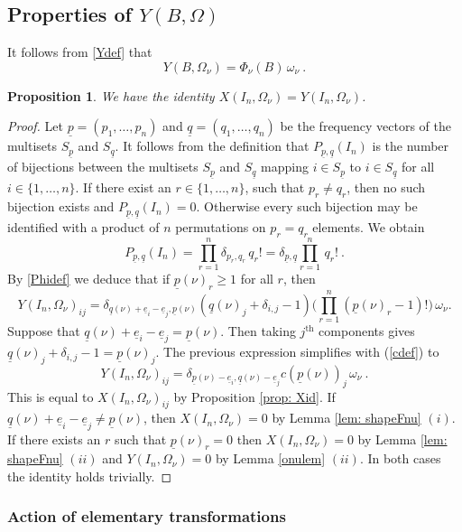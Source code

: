 \documentclass[10pt]{amsart}
\newcommand{\pp}{{\underline{p}}}
\newcommand{\qq}{{\underline{q}}}
\newcommand{\eee}{{\underline{e}}}
\theoremstyle{plain}
\newtheorem{prop}[thm]{Proposition}
\newcommand{\0}{\color{blue}{\mathsf{0}}}
\begin{document}
\subsection{Properties of \texorpdfstring{$Y(B, \Omega)$}{Y} } It follows from   \eqref{Ydef} that
\begin{equation} \label{Ynu}
Y(B,\Omega_{\nu})=\Phi_{\nu}(B)\,\omega_\nu \ . 
\end{equation}

\begin{prop} \label{prop: XYid} We have the identity $X(I_n, \Omega_{\nu}) = Y(I_n,\Omega_{\nu})$. 
\end{prop}
\begin{proof}
Let $\pp=(p_1,\ldots, p_n)$ and $\qq=(q_1,\ldots, q_n)$ be the
frequency vectors of the multisets $S_\pp$ and $S_\qq$. It follows from the definition that $P_{\pp,\qq}(I_n)$
is the number of bijections between the multisets $S_\pp$ and $S_\qq$ mapping $i\in S_\pp$ to $i\in S_\qq$ for all $i\in\{1,\ldots,n\}$.
If there exist an $r\in\{1,\ldots,n\}$, such that
$p_r\neq q_r$, then no such bijection exists and  $P_{\pp,\qq}(I_n)=0$. 
Otherwise every such bijection may be identified with a product of $n$ permutations on $p_r=q_r$ elements. We obtain
$$
P_{\pp,\qq}(I_n)= \prod_{r=1}^n   \delta_{p_r,q_r} \, q_r! =   \delta_{\pp,\qq}  \prod_{r=1}^n    \, q_r!\ .
$$
By \eqref{Phidef} we deduce that if $\pp(\nu)_r\geq1$
for all $r$, then
$$
Y(I_n,\Omega_\nu)_{ij}=\delta_{\qq(\nu)+\eee_i-\eee_j,\pp(\nu)}
(\qq(\nu)_j+\delta_{i,j}-1)\Big(\prod_{r=1}^n(\pp(\nu)_r-1)!\Big)\,\omega_\nu.
$$
Suppose that $\qq(\nu)+\eee_i-\eee_j=\pp(\nu)$. Then taking $j^{\mathrm{th}}$ components gives  $\qq(\nu)_j+\delta_{i,j}-1
=\pp(\nu)_j$. The previous expression simplifies
with (\ref{cdef}) to
$$
Y(I_n,\Omega_\nu)_{ij}=
\delta_{\pp(\nu)-\eee_i,\qq(\nu)-\eee_j}
c(\pp(\nu))_j\,\omega_\nu\ .
$$
This is equal to $X(I_n,\Omega_\nu)_{ij}$ by Proposition \ref{prop: Xid}.
If $\qq(\nu)+\eee_i-\eee_j\neq\pp(\nu)$, then $X(I_n,\Omega_\nu)=0$ by Lemma \ref{lem: shapeFnu} $(i)$.
If  there exists an $r$ such that $\pp(\nu)_r=0$ then $X(I_n,\Omega_\nu)=0$ by Lemma \ref{lem: shapeFnu} $(ii)$ and 
$Y(I_n,\Omega_\nu)=0$ by Lemma \ref{onulem} $(ii)$. In both cases the identity holds trivially. 
\end{proof}

\subsubsection{Action of elementary transformations}
\end{document}
